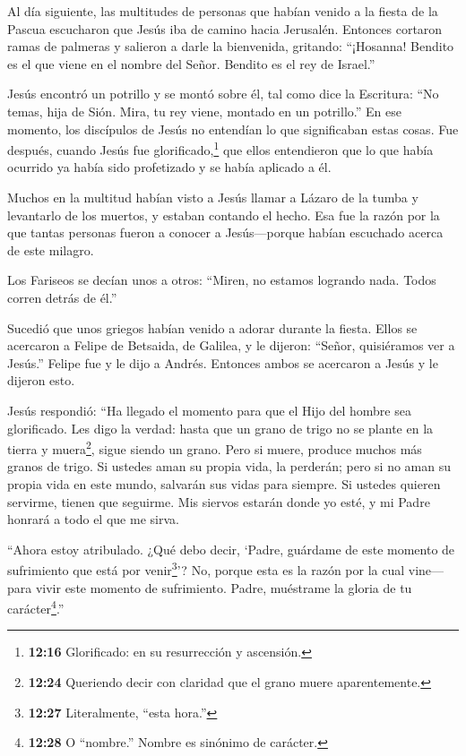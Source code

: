  Al día siguiente, las multitudes de personas que habían
venido a la fiesta de la Pascua escucharon que Jesús iba de camino hacia
Jerusalén.  Entonces cortaron ramas de palmeras y salieron
a darle la bienvenida, gritando: ``¡Hosanna! Bendito es el que viene en
el nombre del Señor. Bendito es el rey de Israel.''

 Jesús encontró un potrillo y se montó sobre él, tal como
dice la Escritura:  ``No temas, hija de Sión. Mira, tu rey
viene, montado en un potrillo.''  En ese momento, los
discípulos de Jesús no entendían lo que significaban estas cosas. Fue
después, cuando Jesús fue glorificado,\footnote{\textbf{12:16}
  Glorificado: en su resurrección y ascensión.} que ellos entendieron
que lo que había ocurrido ya había sido profetizado y se había aplicado
a él.

 Muchos en la multitud habían visto a Jesús llamar a Lázaro
de la tumba y levantarlo de los muertos, y estaban contando el hecho.
 Esa fue la razón por la que tantas personas fueron a
conocer a Jesús---porque habían escuchado acerca de este milagro.

 Los Fariseos se decían unos a otros: ``Miren, no estamos
logrando nada. Todos corren detrás de él.''

 Sucedió que unos griegos habían venido a adorar durante la
fiesta.  Ellos se acercaron a Felipe de Betsaida, de
Galilea, y le dijeron: ``Señor, quisiéramos ver a Jesús.'' 
Felipe fue y le dijo a Andrés. Entonces ambos se acercaron a Jesús y le
dijeron esto.

 Jesús respondió: ``Ha llegado el momento para que el Hijo
del hombre sea glorificado.  Les digo la verdad: hasta que
un grano de trigo no se plante en la tierra y muera\footnote{\textbf{12:24}
  Queriendo decir con claridad que el grano muere aparentemente.}, sigue
siendo un grano. Pero si muere, produce muchos más granos de trigo.
 Si ustedes aman su propia vida, la perderán; pero si no
aman su propia vida en este mundo, salvarán sus vidas para siempre.
 Si ustedes quieren servirme, tienen que seguirme. Mis
siervos estarán donde yo esté, y mi Padre honrará a todo el que me
sirva.

 ``Ahora estoy atribulado. ¿Qué debo decir, `Padre,
guárdame de este momento de sufrimiento que está por venir\footnote{\textbf{12:27}
  Literalmente, ``esta hora.''}'? No, porque esta es la razón por la
cual vine---para vivir este momento de sufrimiento.  Padre,
muéstrame la gloria de tu carácter\footnote{\textbf{12:28} O ``nombre.''
  Nombre es sinónimo de carácter.}.''

